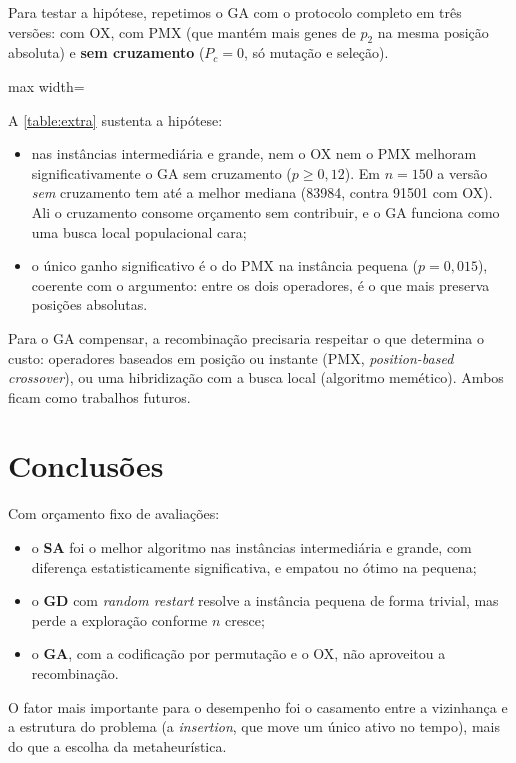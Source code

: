 Para testar a hipótese, repetimos o GA com o protocolo completo em três
versões: com OX, com PMX (que mantém mais genes de $p_2$ na mesma posição
absoluta) e \textbf{sem cruzamento} ($P_c=0$, só mutação e seleção).

\begin{table}[H]
    \centering
    \caption{Experimento adicional: efeito do operador de cruzamento no GA
    (mesmo protocolo da Seção~3, mesmas sementes).}
    \label{table:extra}
    \begin{adjustbox}{max width=\linewidth}
    
    \end{adjustbox}
\end{table}

A \autoref{table:extra} sustenta a hipótese:
\begin{itemize}
    \item nas instâncias intermediária e grande, nem o OX nem o PMX melhoram
    significativamente o GA sem cruzamento ($p\ge0{,}12$). Em $n=150$ a versão
    \emph{sem} cruzamento tem até a melhor mediana (\num{83984}, contra
    \num{91501} com OX). Ali o cruzamento consome orçamento sem contribuir, e
    o GA funciona como uma busca local populacional cara;
    \item o único ganho significativo é o do PMX na instância pequena
    ($p=0{,}015$), coerente com o argumento: entre os dois operadores, é o que
    mais preserva posições absolutas.
\end{itemize}
Para o GA compensar, a recombinação precisaria respeitar o que determina o
custo: operadores baseados em posição ou instante (PMX, \textit{position-based
crossover}), ou uma hibridização com a busca local (algoritmo memético). Ambos
ficam como trabalhos futuros.

\section{Conclusões}

Com orçamento fixo de avaliações:
\begin{itemize}
    \item o \textbf{SA} foi o melhor algoritmo nas instâncias intermediária e
    grande, com diferença estatisticamente significativa, e empatou no ótimo
    na pequena;
    \item o \textbf{GD} com \textit{random restart} resolve a instância
    pequena de forma trivial, mas perde a exploração conforme $n$ cresce;
    \item o \textbf{GA}, com a codificação por permutação e o OX, não
    aproveitou a recombinação.
\end{itemize}
O fator mais importante para o desempenho foi o casamento entre a vizinhança
e a estrutura do problema (a \textit{insertion}, que move um único ativo no
tempo), mais do que a escolha da metaheurística.
